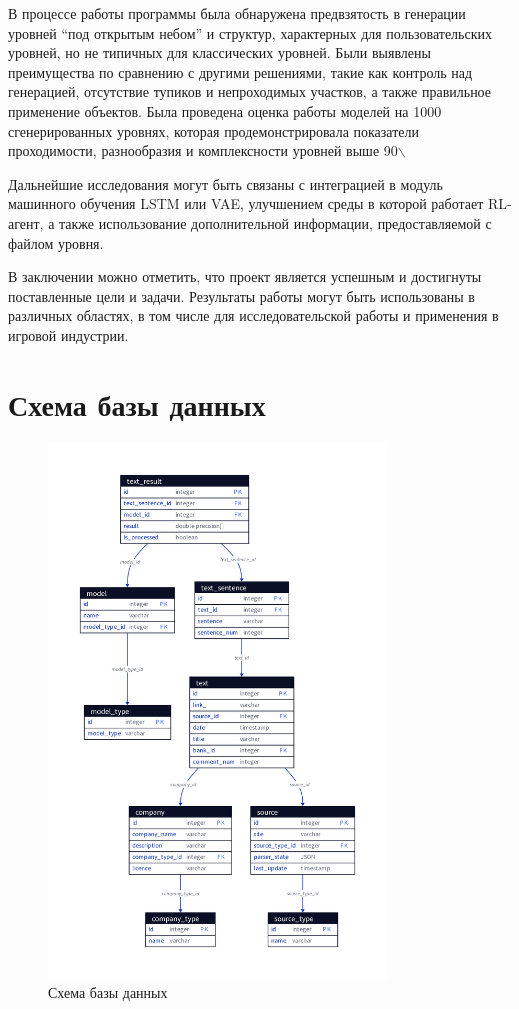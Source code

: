 \documentclass[PI, VKR]{HSEUniversity}
\begin{document}
В процессе работы программы была обнаружена предвзятость в генерации уровней ``под открытым небом'' и  структур, характерных для пользовательских уровней, но не типичных для классических уровней. Были выявлены преимущества по сравнению с другими решениями, такие как контроль над генерацией, отсутствие тупиков и непроходимых участков, а также правильное применение объектов. Была проведена оценка работы моделей на 1000 сгенерированных уровнях, которая продемонстрировала показатели проходимости, разнообразия и комплексности уровней выше 90$\backslash$%

Дальнейшие исследования могут быть связаны с интеграцией в модуль машинного обучения LSTM или VAE, улучшением среды в которой работает RL-агент, а также использование дополнительной информации, предоставляемой с файлом уровня.

В заключении можно отметить, что проект является успешным и достигнуты поставленные цели и задачи. Результаты работы могут быть использованы в различных областях, в том числе для исследовательской работы и применения в игровой индустрии.


\putbibliography
\appendix

\chapter{Схема базы данных}
\label{sec:orgfdfd961}
\begin{figure}[h!]
\centering
\includegraphics[width=0.8\textwidth]{img/d2/database.png}
\caption{\label{fig:database}Схема базы данных}
\end{figure}
\end{document}
